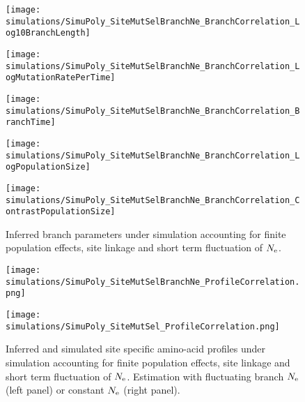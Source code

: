 \begin{figure}[H]
    \centering
    \begin{minipage}{0.32\linewidth}
        \texttt{[image: simulations/SimuPoly\_SiteMutSelBranchNe\_BranchCorrelation\_Log10BranchLength]}
    \end{minipage} \hfill
    \begin{minipage}{0.32\linewidth}
        \texttt{[image: simulations/SimuPoly\_SiteMutSelBranchNe\_BranchCorrelation\_LogMutationRatePerTime]}
    \end{minipage} \hfill
    \begin{minipage}{0.32\linewidth}
        \texttt{[image: simulations/SimuPoly\_SiteMutSelBranchNe\_BranchCorrelation\_BranchTime]}
    \end{minipage} \hfill
    \begin{minipage}{0.32\linewidth}
        \texttt{[image: simulations/SimuPoly\_SiteMutSelBranchNe\_BranchCorrelation\_LogPopulationSize]}
    \end{minipage}
    \begin{minipage}{0.32\linewidth}
        \texttt{[image: simulations/SimuPoly\_SiteMutSelBranchNe\_BranchCorrelation\_ContrastPopulationSize]}
    \end{minipage} \hfill
    \caption[Inferred branch parameters for SimuPoly]{
    Inferred branch parameters under simulation accounting for finite population effects, site linkage and short term fluctuation of $N_{\mathrm{e}}$.
    }
\end{figure}


\begin{figure}[H]
    \centering
    \begin{minipage}{0.49\linewidth}
        \texttt{[image: simulations/SimuPoly\_SiteMutSelBranchNe\_ProfileCorrelation.png]}
    \end{minipage} \hfill
    \begin{minipage}{0.49\linewidth}
        \texttt{[image: simulations/SimuPoly\_SiteMutSel\_ProfileCorrelation.png]}
    \end{minipage}
    \caption[Inferred site amino-acid profiles for SimuPoly]{
    Inferred and simulated site specific amino-acid profiles under simulation accounting for finite population effects, site linkage and short term fluctuation of $N_{\mathrm{e}}$.
    Estimation with fluctuating branch $N_{\mathrm{e}}$ (left panel) or constant $N_{\mathrm{e}}$ (right panel).}
\end{figure}

